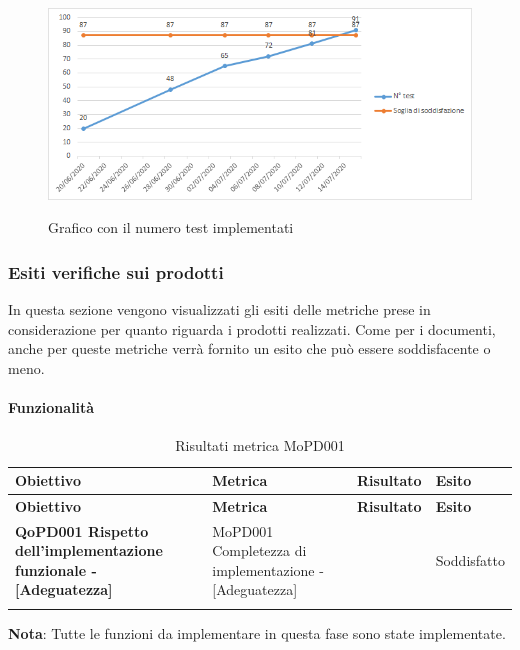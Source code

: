 \begin{figure}[H]
  \centering
  \includegraphics[width=12cm]{img/testImplRa.png}
  \label{fig:test_implementati}
  \caption{Grafico con il numero test implementati}
\end{figure}

\subsubsection{Esiti verifiche sui prodotti}

\label{sub:esiti_verifiche_sui_prodotti}
In questa sezione vengono visualizzati gli esiti delle metriche prese in considerazione per quanto riguarda i prodotti realizzati. Come per i documenti, anche per queste metriche verrà fornito un esito che può essere soddisfacente o meno.

\paragraph{Funzionalità}
\label{sub:funzionalita}

\renewcommand{\arraystretch}{2} %
\begin{longtable}[H]{>{\centering\bfseries}m{5cm} >{\centering}m{5cm} >{\centering}m{2.5cm} >{\centering\arraybackslash}m{2.5cm}}  
  \rowcolor{lightgray}
  {\textbf{Obiettivo}} & {\textbf{Metrica}} & {\textbf{Risultato}} & {\textbf{Esito}}  \\
  \endfirsthead%
  \rowcolor{lightgray}
  {\textbf{Obiettivo}} & {\textbf{Metrica}} & {\textbf{Risultato}} & {\textbf{Esito}}  \\
  \endhead%
  \textbf{QoPD001 Rispetto dell’implementazione funzionale - [Adeguatezza]} & MoPD001 Completezza di implementazione - [Adeguatezza] & 0 & Soddisfatto \\
  \caption{Risultati metrica MoPD001}
  \label{tab:my-table}
\end{longtable}
\textbf{Nota}: Tutte le funzioni da implementare in questa fase sono state implementate.


